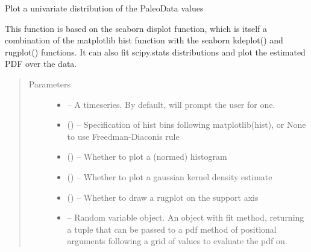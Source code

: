 \documentclass[letterpaper,10pt,english]{sphinxmanual}
\begin{document}

\begin{fulllineitems}
\label{\detokenize{Main:pyleoclim.histTs}}
Plot a univariate distribution of the PaleoData values

This function is based on the seaborn displot function, which is
itself a combination of the matplotlib hist function with the
seaborn kdeplot() and rugplot() functions. It can also fit
scipy.stats distributions and plot the estimated PDF over the data.
\begin{quote}\begin{description}
\item[{Parameters}] \leavevmode\begin{itemize}
\item {} 
 -- A timeseries. By default, will prompt the user for one.

\item {} 
 () -- Specification of hist bins following matplotlib(hist),
or None to use Freedman-Diaconis rule

\item {} 
 () -- Whether to plot a (normed) histogram

\item {} 
 () -- Whether to plot a gaussian kernel density estimate

\item {} 
 () -- Whether to draw a rugplot on the support axis

\item {} 
 -- Random variable object. An object with fit method, returning
a tuple that can be passed to a pdf method of positional
arguments following a grid of values to evaluate the pdf on.


\end{itemize}
\end{description}
\end{quote}
\end{fulllineitems}
\end{document}
